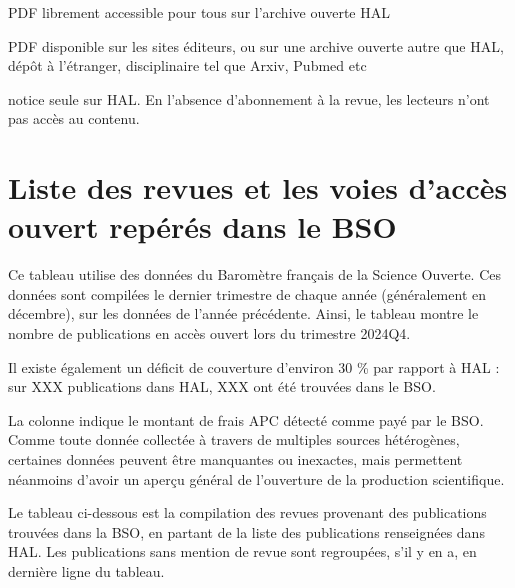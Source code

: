 \documentclass[french, 11pt]{dibiso/biso}
\begin{document}
\begin{tcolorbox}[colback=white, arc=4pt, boxrule=0.5pt, left=2pt, right=2pt, top=2pt, bottom=2pt]
\footnotesize
\begin{description}[leftmargin=!, labelwidth=\widthof{\bfseries OA Hors HAL}]
    \item[TI dans HAL] PDF librement accessible pour tous sur l'archive ouverte HAL
    \item[OA Hors HAL] PDF disponible sur les sites éditeurs, ou sur une archive ouverte autre que HAL, dépôt à l'étranger, disciplinaire tel que Arxiv, Pubmed etc
    \item[Accès fermé] notice seule sur HAL. En l'absence d'abonnement à la revue, les lecteurs n'ont pas accès au contenu.
\end{description}
\end{tcolorbox}

\bigskip







\pagebreak

\section{Liste des revues et les voies d'accès ouvert repérés dans le BSO}

Ce tableau utilise des données du Baromètre français de la Science Ouverte. Ces données sont compilées le dernier trimestre de chaque année (généralement en décembre), sur les données de l'année précédente. Ainsi, le tableau montre le nombre de publications en accès ouvert lors du trimestre 2024Q4.

Il existe également un déficit de couverture d'environ 30 \% par rapport à HAL : sur XXX publications dans HAL, XXX ont été trouvées dans le BSO.

La colonne  indique le montant de frais APC détecté comme payé par le BSO. Comme toute donnée collectée à travers de multiples sources hétérogènes, certaines données peuvent être manquantes ou inexactes, mais permettent néanmoins d'avoir un aperçu général de l'ouverture de la production scientifique.

Le tableau ci-dessous est la compilation des {\bsojournalsnbjournals} revues provenant des {\bsojournalsnbworksfoundinbso} publications trouvées dans la BSO, en partant de la liste des {\bsojournalsnbworks} publications renseignées dans HAL. Les publications sans mention de revue sont regroupées, s'il y en a, en dernière ligne du tableau.
\end{document}
